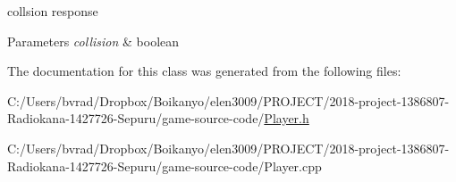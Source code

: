 collsion response 


\begin{DoxyParams}{Parameters}
{\em collision} & boolean \\
\hline
\end{DoxyParams}


The documentation for this class was generated from the following files\+:\begin{DoxyCompactItemize}
\item 
C\+:/\+Users/bvrad/\+Dropbox/\+Boikanyo/elen3009/\+P\+R\+O\+J\+E\+C\+T/2018-\/project-\/1386807-\/\+Radiokana-\/1427726-\/\+Sepuru/game-\/source-\/code/\mbox{\hyperlink{_player_8h}{Player.\+h}}\item 
C\+:/\+Users/bvrad/\+Dropbox/\+Boikanyo/elen3009/\+P\+R\+O\+J\+E\+C\+T/2018-\/project-\/1386807-\/\+Radiokana-\/1427726-\/\+Sepuru/game-\/source-\/code/Player.\+cpp\end{DoxyCompactItemize}
